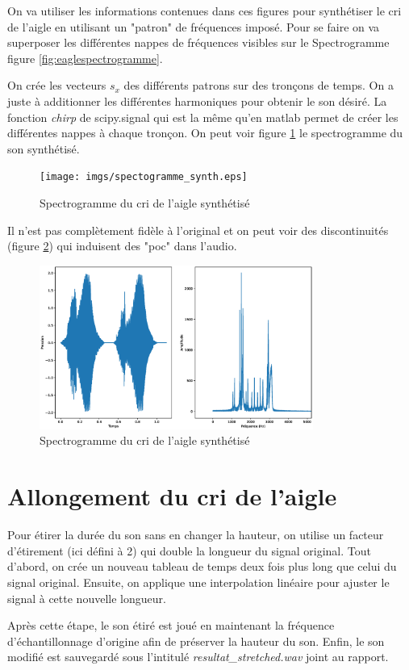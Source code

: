 \documentclass[12pt]{report}
\begin{document}
On va utiliser les informations contenues dans ces figures pour synthétiser le cri de l'aigle %
en utilisant un "patron" de fréquences imposé. Pour se faire on va superposer les différentes nappes %
de fréquences visibles sur le Spectrogramme figure \ref{fig:eaglespectrogramme}.

On crée les vecteurs \(s_x\) des différents patrons sur des tronçons de temps. On a juste à additionner %
les différentes harmoniques pour obtenir le son désiré. La fonction \textit{chirp} de scipy.signal qui est la %
même qu'en matlab permet de créer les différentes nappes à chaque tronçon. On peut voir figure %
\ref{fig:eaglespectrogrammesynth} le spectrogramme du son synthétisé.

\begin{figure}
    \centering
    \texttt{[image: imgs/spectogramme\_synth.eps]}
    \caption{Spectrogramme du cri de l'aigle synthétisé}
    \label{fig:eaglespectrogrammesynth}
\end{figure}

Il n'est pas complètement fidèle à l'original et on peut voir des discontinuités (figure \ref{fig:eagle_synth}) %
qui induisent des "poc" dans l'audio.

\begin{figure}
    \centering
    \includegraphics[width=0.8\textwidth]{imgs/synth_eagle.eps}
    \caption{Spectrogramme du cri de l'aigle synthétisé}
    \label{fig:eagle_synth}
\end{figure}

\chapter{Allongement du cri de l'aigle}

Pour étirer la durée du son sans en changer la hauteur, on utilise un facteur d'étirement %
(ici défini à 2) qui double la longueur du signal original. Tout d'abord, on crée un nouveau %
tableau de temps deux fois plus long que celui du signal original. Ensuite, on applique une %
interpolation linéaire pour ajuster le signal à cette nouvelle longueur.

Après cette étape, le son étiré est joué en maintenant la fréquence d'échantillonnage %
d'origine afin de préserver la hauteur du son. Enfin, le son modifié est sauvegardé %
sous l'intitulé \textit{resultat\_stretched.wav} joint au rapport.
\end{document}
